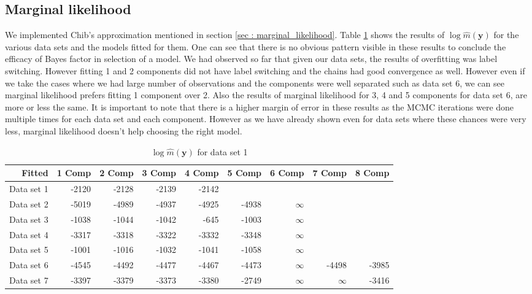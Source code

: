 \subsection{Marginal likelihood}
We implemented Chib's approximation mentioned in section \ref{sec : marginal_likelihood}. Table \ref{table : marginal_likelihood_results} shows the results of $\log{\hat{m}(\boldsymbol{y})}$ for the various data sets and the models fitted for them. One can see that there is no obvious pattern visible in these results to conclude the efficacy of Bayes factor in selection of a model. We had observed so far that given our data sets, the results of overfitting was label switching. However fitting 1 and 2 components did not have label switching and the chains had good convergence as well. However even if we take the cases where we had large number of observations and the components were well separated such as data set 6, we can see marginal likelihood prefers fitting 1 component over 2. Also the results of marginal likelihood for 3, 4 and 5 components for data set 6, are more or less the same. It is important to note that there is a higher margin of error in these results as the MCMC iterations were done multiple times for each data set and each component. However as we have already shown even for data sets where these chances were very less, marginal likelihood doesn't help choosing the right model.

\begin{table}[!htb]
\centering
\caption{$\log{\hat{m}(\boldsymbol{y})}$ for data set 1}
\label{table : marginal_likelihood_results} 
\begin{tabular}{rrrrrrrrr}
\toprule
Fitted & 1 Comp & 2 Comp & 3 Comp & 4 Comp & 5 Comp & 6 Comp & 7 Comp & 8 Comp \\\midrule
Data set 1 & -2120 & -2128 & -2139 & -2142 &  &  &  &  \\
Data set 2 & -5019 & -4989 & -4937 & -4925 & -4938 & $\infty$ &  &  \\
Data set 3 & -1038 & -1044 & -1042 & -645 & -1003 & $\infty$ &  &  \\
Data set 4 & -3317 & -3318 & -3322 & -3332 & -3348 & $\infty$ &  &  \\
Data set 5 & -1001 & -1016 & -1032 & -1041 & -1058 & $\infty$ &  &  \\
Data set 6 & -4545 & -4492 & -4477 & -4467 & -4473 & $\infty$ & -4498 & -3985 \\
Data set 7 & -3397 & -3379 & -3373 & -3380 & -2749 & $\infty$ & $\infty$ & -3416 \\ \bottomrule
\end{tabular}
\end{table}



